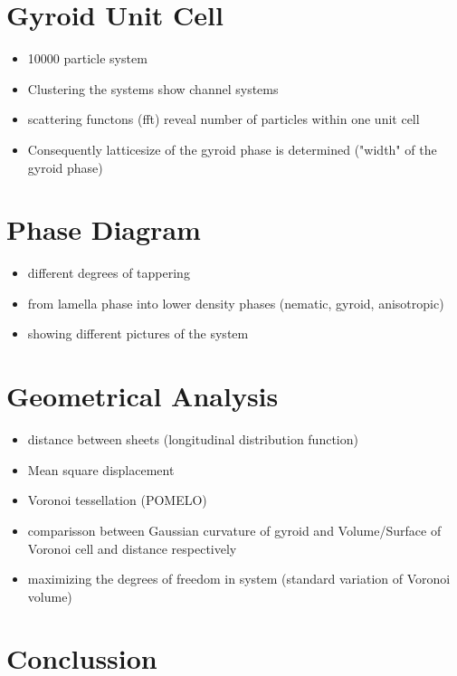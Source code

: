 \documentclass[epj,twocolumn]{webofc}
\begin{document}
\section{Gyroid Unit Cell}
\label{sec:UnitCell}

\begin{itemize}
    \item 10000 particle system
    \item Clustering the systems show channel systems
    \item scattering functons (fft) reveal number of particles within one unit cell
    \item Consequently latticesize of the gyroid phase is determined ("width" of the gyroid phase)
\end{itemize}

\section{Phase Diagram}
\label{sec:PhaseDiagram}

\begin{itemize}
    \item different degrees of tappering
    \item from lamella phase into lower density phases (nematic, gyroid, anisotropic)
    \item showing different pictures of the system
\end{itemize}

\section{Geometrical Analysis}
\label{sec:GeometricalAnalysis}

\begin{itemize}
    \item distance between sheets (longitudinal distribution function)
    \item Mean square displacement
    \item Voronoi tessellation (POMELO)
    \item comparisson between Gaussian curvature of gyroid and Volume/Surface of Voronoi cell and distance respectively
    \item maximizing the degrees of freedom in system (standard variation of Voronoi volume)
\end{itemize}

\section{Conclussion}
\label{sec:Conclussion}
\end{document}

